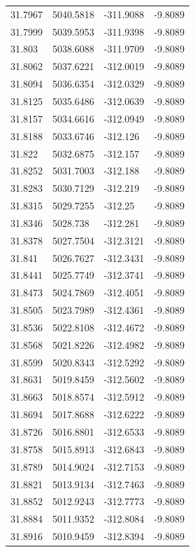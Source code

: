 \begin{table}[H]
\begin{tabular}{llll}
31.7967 & 5040.5818 & -311.9088 & -9.8089 \\
31.7999 & 5039.5953 & -311.9398 & -9.8089 \\
31.803 & 5038.6088 & -311.9709 & -9.8089 \\
31.8062 & 5037.6221 & -312.0019 & -9.8089 \\
31.8094 & 5036.6354 & -312.0329 & -9.8089 \\
31.8125 & 5035.6486 & -312.0639 & -9.8089 \\
31.8157 & 5034.6616 & -312.0949 & -9.8089 \\
31.8188 & 5033.6746 & -312.126 & -9.8089 \\
31.822 & 5032.6875 & -312.157 & -9.8089 \\
31.8252 & 5031.7003 & -312.188 & -9.8089 \\
31.8283 & 5030.7129 & -312.219 & -9.8089 \\
31.8315 & 5029.7255 & -312.25 & -9.8089 \\
31.8346 & 5028.738 & -312.281 & -9.8089 \\
31.8378 & 5027.7504 & -312.3121 & -9.8089 \\
31.841 & 5026.7627 & -312.3431 & -9.8089 \\
31.8441 & 5025.7749 & -312.3741 & -9.8089 \\
31.8473 & 5024.7869 & -312.4051 & -9.8089 \\
31.8505 & 5023.7989 & -312.4361 & -9.8089 \\
31.8536 & 5022.8108 & -312.4672 & -9.8089 \\
31.8568 & 5021.8226 & -312.4982 & -9.8089 \\
31.8599 & 5020.8343 & -312.5292 & -9.8089 \\
31.8631 & 5019.8459 & -312.5602 & -9.8089 \\
31.8663 & 5018.8574 & -312.5912 & -9.8089 \\
31.8694 & 5017.8688 & -312.6222 & -9.8089 \\
31.8726 & 5016.8801 & -312.6533 & -9.8089 \\
31.8758 & 5015.8913 & -312.6843 & -9.8089 \\
31.8789 & 5014.9024 & -312.7153 & -9.8089 \\
31.8821 & 5013.9134 & -312.7463 & -9.8089 \\
31.8852 & 5012.9243 & -312.7773 & -9.8089 \\
31.8884 & 5011.9352 & -312.8084 & -9.8089 \\
31.8916 & 5010.9459 & -312.8394 & -9.8089 \\

\end{tabular}
\end{table}
